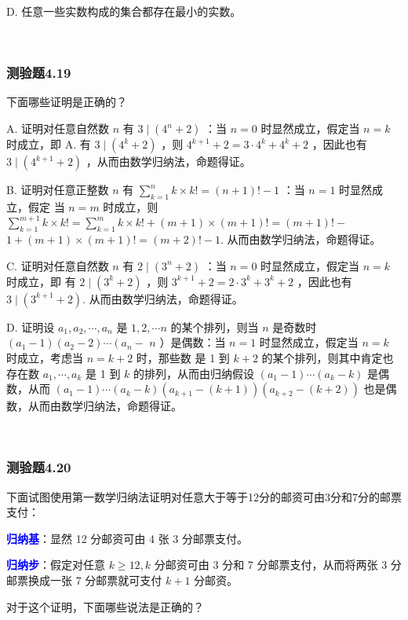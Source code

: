 \documentclass[UTF8, heading=true]{ctexart}
\begin{document}
D.  
任意一些实数构成的集合都存在最小的实数。

\textcolor{white}{答案：BC}

\subsubsection{测验题4.19}

下面哪些证明是正确的？

A. 证明对任意自然数 $n$ 有 $3 \mid\left(4^n+2\right)$ ：当 $n=0$ 时显然成立，假定当 $n=k$ 时成立，即 A. 有 $3 \mid\left(4^k+2\right)$ ，则 $4^{k+1}+2=3 \cdot 4^k+4^k+2$ ，因此也有 $3 \mid\left(4^{k+1}+2\right)$ ，从而由数学归纳法，命题得证。

B. 证明对任意正整数 $n$ 有 $\sum_{k=1}^n k \times k!=(n+1)!-1$ ：当 $n=1$ 时显然成立，假定
当 $n=m$ 时成立，则 $\sum_{k=1}^{m+1} k \times k!=\sum_{k=1}^m k \times k!+(m+1) \times(m+1)!=(m+1)!-$ $1+(m+1) \times(m+1)!=(m+2)!-1$. 从而由数学归纳法，命题得证。

C. 证明对任意自然数 $n$ 有 $2 \mid\left(3^n+2\right)$ ：当 $n=0$ 时显然成立，假定当 $n=k$ 时成立，即
有 $2 \mid\left(3^k+2\right)$ ，则 $3^{k+1}+2=2 \cdot 3^k+3^k+2$ ，因此也有 $3 \mid\left(3^{k+1}+2\right)$. 从而由数学归纳法，命题得证。

D. 证明设 $a_1, a_2, \cdots, a_n$ 是 $1,2, \cdots n$ 的某个排列，则当 $n$ 是奇数时 $\left(a_1-1\right)\left(a_2-2\right) \cdots\left(a_n-\right.$ $n$ ）是偶数：当 $n=1$ 时显然成立，假定当 $n=k$ 时成立，考虑当 $n=k+2$ 时，那些数
是 1 到 $k+2$ 的某个排列，则其中肯定也存在数 $a_1, \cdots, a_k$ 是 1 到 $k$ 的排列，从而由归纳假设 $\left(a_1-1\right) \cdots\left(a_k-k\right)$ 是偶数，从而 $\left(a_1-1\right) \cdots\left(a_k-k\right)\left(a_{k+1}-(k+1)\right)\left(a_{k+2}-(k+2)\right)$ 也是偶数，从而由数学归纳法，命题得证。


\textcolor{white}{答案：AB}

\subsubsection{测验题4.20}

下面试图使用第一数学归纳法证明对任意大于等于12分的邮资可由3分和7分的邮票支付：

\textcolor{blue}{\textbf{归纳基}}：显然 12 分邮资可由 4 张 3 分邮票支付。

\textcolor{blue}{\textbf{归纳步}}：假定对任意 $k \geq 12, k$ 分邮资可由 3 分和 7 分邮票支付，从而将两张 3 分邮票换成一张 7 分邮票就可支付 $k+1$ 分邮资。

对于这个证明，下面哪些说法是正确的？
\end{document}
